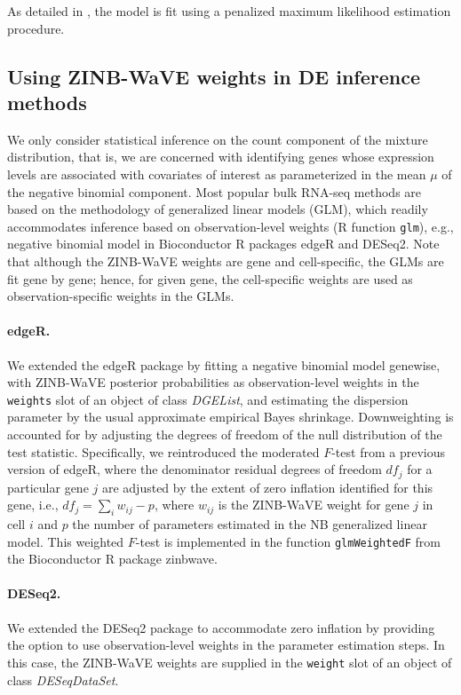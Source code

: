 \documentclass{bmcart}
\newcommand{\RPack}[1]{\textsf{#1}}
\newcommand{\RClass}[1]{\textit{#1}}
\newcommand{\RObj}[1]{\texttt{#1}}
\begin{document}
As detailed in \citet{Risso2017}, the model is fit using a penalized maximum likelihood estimation procedure.

\subsection*{Using ZINB-WaVE weights in DE inference methods}

We only consider statistical inference on the count component of the mixture distribution, that is, we are concerned with identifying genes whose expression levels are associated with covariates of interest as parameterized in the mean $\mu$ of the negative binomial component. Most popular bulk RNA-seq methods are based on the methodology of generalized linear models (GLM), which readily accommodates inference based on observation-level weights (R function \RObj{glm}), e.g., negative binomial model in Bioconductor R packages \RPack{edgeR} and \RPack{DESeq2}. Note that although the ZINB-WaVE weights are gene and cell-specific, the GLMs are fit gene by gene; hence, for given gene, the cell-specific weights are used as observation-specific weights in the GLMs. 

\paragraph{edgeR.} 
We extended the \RPack{edgeR} package \citep{Robinson2010a,McCarthy2012a} by fitting a negative binomial model genewise, with ZINB-WaVE posterior probabilities as observation-level weights in the \RObj{weights} slot of an object of class \RClass{DGEList}, and estimating the dispersion parameter by the usual approximate empirical Bayes shrinkage. Downweighting is accounted for by adjusting the degrees of freedom of the null distribution of the test statistic. Specifically, we reintroduced the moderated $F$-test from a previous version of \RPack{edgeR}, where the denominator residual degrees of freedom $df_j$ for a particular gene $j$ are adjusted by the extent of zero inflation identified for this gene, i.e., $df_j=\sum_i w_{ij} - p$, where $w_{ij}$ is the ZINB-WaVE weight for gene $j$ in cell $i$ and $p$ the number of parameters estimated in the NB generalized linear model. This weighted $F$-test is implemented in the function \RObj{glmWeightedF} from the Bioconductor R package \RPack{zinbwave}.

\paragraph{DESeq2.}
We extended the \RPack{DESeq2} package \citep{Love2014} to accommodate zero inflation by providing the option to use observation-level weights in the parameter estimation steps. In this case, the ZINB-WaVE weights are supplied in the \RObj{weight} slot of an object of class \RClass{DESeqDataSet}.
\end{document}
